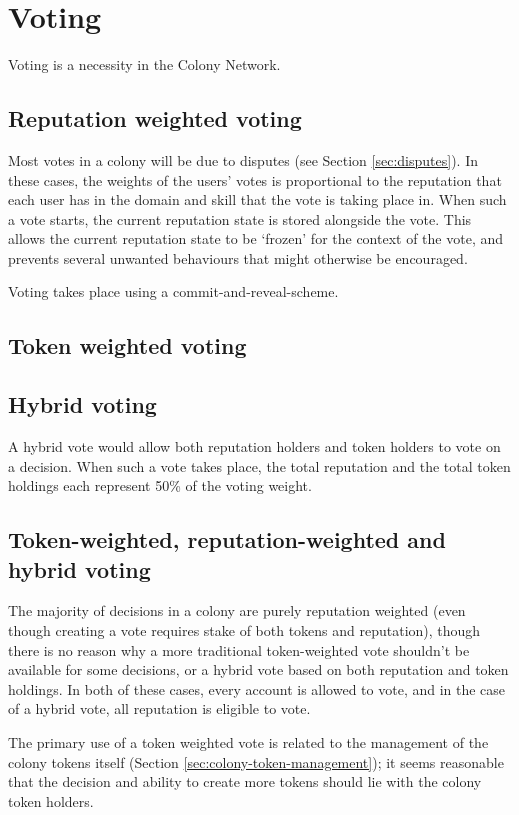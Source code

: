 \section{Voting}
Voting is a necessity in the Colony Network. 

\subsection{Reputation weighted voting}
Most votes in a colony will be due to disputes (see Section \ref{sec:disputes}). In these cases, the weights of the users' votes is proportional to the reputation that each user has in the domain and skill that the vote is taking place in. When such a vote starts, the current reputation state is stored alongside the vote. This allows the current reputation state to be `frozen' for the context of the vote, and prevents several unwanted behaviours that might otherwise be encouraged.

Voting takes place using a commit-and-reveal-scheme.

\subsection{Token weighted voting}

\subsection{Hybrid voting}
A hybrid vote would allow both reputation holders and token holders to vote on a decision. When such a vote takes place, the total reputation and the total token holdings each represent 50\% of the voting weight.

\subsection{Token-weighted, reputation-weighted and hybrid voting}
The majority of decisions in a colony are purely reputation weighted (even though creating a vote requires stake of both tokens and reputation), though there is no reason why a more traditional token-weighted vote shouldn't be available for some decisions, or a hybrid vote based on both reputation and token holdings. In both of these cases, every account is allowed to vote, and in the case of a hybrid vote, all reputation is eligible to vote.

The primary use of a token weighted vote is related to the management of the colony tokens itself (Section \ref{sec:colony-token-management}); it seems reasonable that the decision and ability to create more tokens should lie with the colony token holders.